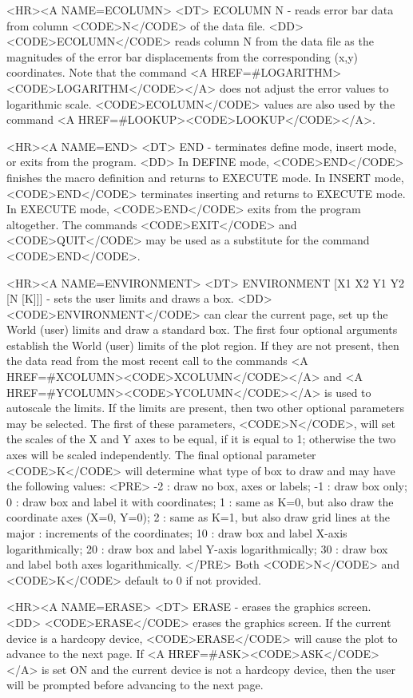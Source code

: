 \begin{rawhtml}
<HR><A NAME=ECOLUMN>
<DT>
ECOLUMN N - reads error bar data from column <CODE>N</CODE> of the data file.
<DD>
	<CODE>ECOLUMN</CODE> reads column N from the data file as the
	magnitudes of the error bar displacements from the corresponding (x,y)
	coordinates.  Note that the command
	<A HREF=#LOGARITHM><CODE>LOGARITHM</CODE></A>
	does not adjust the error values to logarithmic scale.
	<CODE>ECOLUMN</CODE> values are also used by the command
	<A HREF=#LOOKUP><CODE>LOOKUP</CODE></A>.

<HR><A NAME=END>
<DT>
END - terminates define mode, insert mode, or exits from the program.
<DD>
	In DEFINE mode, <CODE>END</CODE> finishes the macro definition
	and returns to EXECUTE mode.  In INSERT mode, <CODE>END</CODE>
	terminates inserting and returns to EXECUTE mode.  In EXECUTE
	mode, <CODE>END</CODE> exits from the program altogether.
	The commands <CODE>EXIT</CODE> and <CODE>QUIT</CODE> may be
	used as a substitute for the command <CODE>END</CODE>.

<HR><A NAME=ENVIRONMENT>
<DT>
ENVIRONMENT [X1 X2 Y1 Y2 [N [K]]] - sets the user limits and draws a box.
<DD>
	<CODE>ENVIRONMENT</CODE> can clear the current page, set up the
	World (user) limits and draw a standard box.  The first four
	optional arguments establish the World (user) limits of the plot
	region.  If they are not present, then the data read from the most
	recent call to the commands <A HREF=#XCOLUMN><CODE>XCOLUMN</CODE></A>
	and <A HREF=#YCOLUMN><CODE>YCOLUMN</CODE></A> is used to autoscale
	the limits.  If the limits are present, then two other optional
	parameters may be selected.  The first of these parameters,
	<CODE>N</CODE>, will set the scales of the X and Y axes to be equal,
	if it is equal to 1; otherwise the two axes will be scaled
	independently.  The final optional parameter <CODE>K</CODE> will
	determine what type of box to draw and may have the following values:
	<PRE>
    -2 : draw no box, axes or labels;
    -1 : draw box only;
     0 : draw box and label it with coordinates;
     1 : same as K=0, but also draw the coordinate axes (X=0, Y=0);
     2 : same as K=1, but also draw grid lines at the major
       : increments of the coordinates;
    10 : draw box and label X-axis logarithmically;
    20 : draw box and label Y-axis logarithmically;
    30 : draw box and label both axes logarithmically.
	</PRE>
	Both <CODE>N</CODE> and <CODE>K</CODE> default to 0 if not provided.

<HR><A NAME=ERASE>
<DT>
ERASE - erases the graphics screen.
<DD>
	<CODE>ERASE</CODE> erases the graphics screen.  If the current
	device is a hardcopy device, <CODE>ERASE</CODE> will cause the
	plot to advance to the next page.  If <A HREF=#ASK><CODE>ASK</CODE></A>
	is set ON and the current device is not a hardcopy device, then the
	user will be prompted before advancing to the next page.


\end{rawhtml}
